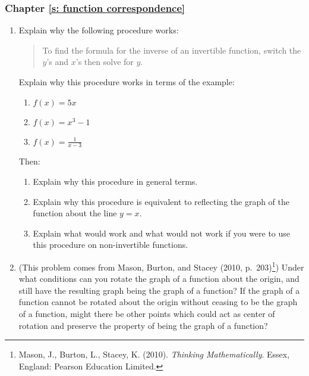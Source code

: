 \documentclass[11pt]{article}
\theoremstyle{definition}
\begin{document}
\subsubsection*{Chapter \ref{s: function correspondence}}

\begin{enumerate}[resume]	
\item 
Explain why the following procedure works: 

\begin{quote}To find the formula for the inverse of an invertible function, switch the $y$'s and $x$'s then solve for $y$. \end{quote}

Explain why this procedure works in terms of the example:
	\begin{enumerate}
	\item $f(x) = 5x$
	\item $f(x) = x^3 -1$
	\item $f(x) = \frac{1}{x-3}$
	\end{enumerate}
Then:
	\begin{enumerate}[resume] 
	\item Explain why this procedure in general terms.
	\item Explain why this procedure is equivalent to reflecting the graph of the function about the line $y=x$.
	\item Explain what would work and what would not work if you were to use this procedure on non-invertible functions.
	\end{enumerate}
	
\item %
(This problem comes from Mason, Burton, and Stacey (2010, p.~203)\footnote{Mason, J., Burton, L., Stacey, K. (2010). {\it Thinking Mathematically}. Essex, England: Pearson Education Limited.}) Under what conditions can you rotate the graph of a function about the origin, and still have the resulting graph being the graph of a function? If the graph of a function cannot be rotated about the origin without ceasing to be the graph of a function, might there be other points which could act as center of rotation and preserve the property of being the graph of a function?


\end{enumerate}
\end{document}
